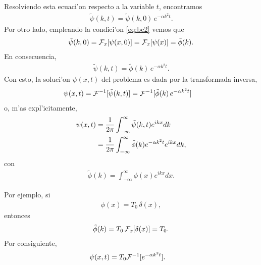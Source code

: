 Resolviendo esta ecuaci'on respecto a la variable $t$, encontramos
\begin{align}
\tilde{\psi}(k,t)=\tilde{\psi}(k,0)\,e^{-\alpha k^2 t}.
\end{align}
Por otro lado, empleando la condici'on \eqref{eq:bc2} vemos que
\begin{align}
\tilde{\psi}(k,0) = {\cal F}_{x}[\psi(x,0)]={\cal F}_{x}[\psi(x)] =\tilde{\phi}(k).
\end{align}
En consecuencia,
\begin{align}
\tilde{\psi}(k,t)=\tilde{\phi}(k)\,e^{-\alpha k^2 t}.
\end{align}
Con esto, la soluci'on $\psi(x,t)$ del problema es dada por la transformada inversa,
\begin{align}
\psi(x,t) &= {\cal F}^{-1}[\tilde{\psi}(k,t)]= {\cal F}^{-1}[\tilde{\phi}(k)\,e^{-\alpha k^2 t}]
\end{align}
o, m'as expl'icitamente,
\begin{align}
\psi(x,t) &= \frac{1}{2\pi}\int_{-\infty}^{\infty}\tilde{\psi}(k,t)e^{ikx} dk\notag \\
&= \frac{1}{2\pi}\int_{-\infty}^{\infty}\tilde{\phi}(k)e^{-\alpha k^2 t}e^{ikx} dk,
\end{align}
con
\begin{align}
\tilde{\phi}(k)=\int_{-\infty}^{\infty}\phi(x)e^{ikx}dx.
\end{align}

Por ejemplo, si
\begin{align}
\phi(x)=T_{0}\,\delta(x),
\end{align}
entonces
\begin{align}
\tilde{\phi}(k)=T_{0}\,{\cal F}_{x}[\delta(x)]=T_{0}.
\end{align}
Por consiguiente,
\begin{align}
\psi(x,t) &= T_{0}{\cal F}^{-1}[e^{-\alpha k^2 t}].
\end{align}

